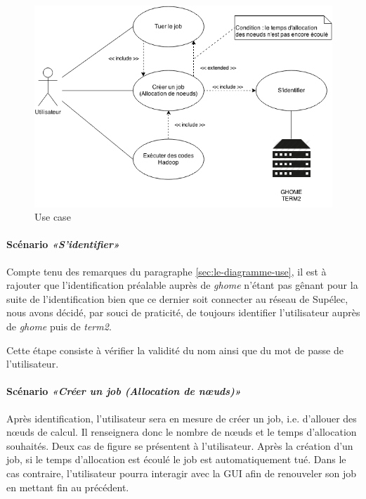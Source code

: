 \begin{figure}[h!]
  \centering
  \includegraphics[width=14cm]{images/use_case.png}
  \caption{Use case}
  \label{fig:use_case}
\end{figure}

\paragraph{Scénario \emph{«S’identifier»}}
\par Compte tenu des remarques du paragraphe \ref{sec:le-diagramme-use}, il est à rajouter que l'identification préalable auprès de \emph{ghome} n'étant pas gênant pour la suite de l'identification bien que ce dernier soit connecter au réseau de Supélec, nous avons décidé, par souci de praticité, de toujours identifier l'utilisateur auprès de \emph{ghome} puis de \emph{term2}.
\par Cette étape consiste à vérifier la validité du nom ainsi que du mot de passe de l’utilisateur.

\paragraph{Scénario \emph{«Créer un job (Allocation de nœuds)»}}
\label{sec:scenario-creer-un}
\par Après identification, l’utilisateur sera en mesure de créer un job, i.e. d’allouer des nœuds de calcul. Il renseignera donc le nombre de nœuds et le temps d’allocation souhaités. Deux cas de figure se présentent à l'utilisateur. Après la création d’un job, si le temps d’allocation est écoulé le job est automatiquement tué. Dans le cas contraire, l’utilisateur pourra interagir avec la GUI afin de renouveler son job en mettant fin au précédent.

